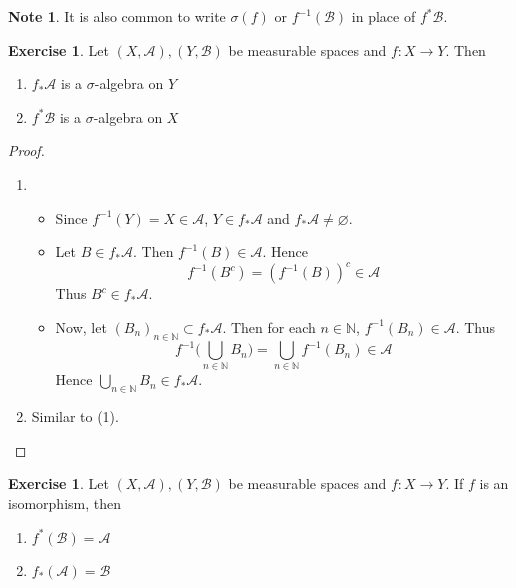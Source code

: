 \documentclass{book}
\theoremstyle{definition}
\newtheorem{note}[definition]{Note}
\newtheorem{ex}[definition]{Exercise}
\newcommand{\sig}{\sigma}
\newcommand{\N}{\mathbb{N}}
\newcommand{\MA}{\mathcal{A}}
\newcommand{\MB}{\mathcal{B}}
\newcommand{\lex}[1]{\label{ex:#1}}
\DeclareMathOperator*{\0}{\mbf{0}}
\DeclareMathOperator*{\1}{\mbf{1}}
\begin{document}
	\begin{note}
		It is also common to write $\sig(f)$ or $f^{-1}(\MB)$ in place of $f^*\MB$.
	\end{note}	
	
	\begin{ex} \lex{00000} 
		Let $(X,\MA), (Y,\MB)$ be measurable spaces and $f: X \rightarrow Y$. Then 
		\begin{enumerate}
			\item $f_*\MA$ is a $\sig$-algebra on $Y$
			\item $f^*\MB$ is a $\sig$-algebra on $X$
		\end{enumerate}
	\end{ex}
	
	\begin{proof}\
		\begin{enumerate}
			\item 
			\begin{itemize}
				\item Since $f^{-1}(Y) = X \in \MA$, $Y \in f_*\MA$ and $f_*\MA \neq \varnothing$. 
				\item Let $B \in f_*\MA$. Then $f^{-1}(B) \in \MA$. Hence $$f^{-1}(B^c) = (f^{-1}(B))^c \in \MA$$ Thus $B^c \in f_*\MA$. 
				\item Now, let $(B_n)_{n \in \N} \subset f_*\MA$. Then for each $n \in \N$, $f^{-1}(B_n) \in \MA$. Thus $$f^{-1}\bigg(\bigcup_{n \in \N} B_n \bigg) = \bigcup_{n \in \N} f^{-1}(B_n) \in \MA$$ Hence $\bigcup\limits_{n \in \N} B_n \in f_*\MA$.
			\end{itemize}
			\item Similar to (1).
		\end{enumerate}
	\end{proof}

	\begin{ex}
		Let $(X,\MA), (Y,\MB)$ be measurable spaces and $f: X \rightarrow Y$. If $f$ is an isomorphism, then
		\begin{enumerate}
			\item $f^*(\MB) = \MA$
			\item $f_*(\MA) = \MB$
		\end{enumerate}
	\end{ex}
\end{document}
